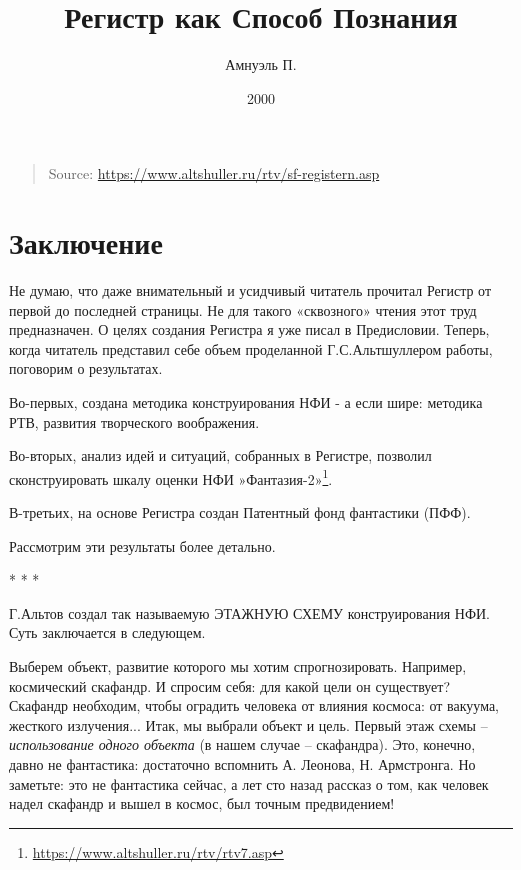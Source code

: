 \documentclass[11pt,a4paper]{article}
\title{Регистр как Способ Познания}
\author{Амнуэль П.}
\date{2000}
\begin{document}
\maketitle

\begin{quote}
  Source: \url{https://www.altshuller.ru/rtv/sf-registern.asp}
\end{quote}
\section*{Заключение}

Не думаю, что даже внимательный и усидчивый читатель прочитал Регистр от
первой до последней страницы. Не для такого «сквозного» чтения этот труд
предназначен. О целях создания Регистра я уже писал в Предисловии. Теперь,
когда читатель представил себе объем проделанной Г.С.Альтшуллером работы,
поговорим о результатах.

Во-первых, создана методика конструирования НФИ - а если шире: методика РТВ,
развития творческого воображения.

Во-вторых, анализ идей и ситуаций, собранных в Регистре, позволил
сконструировать шкалу оценки НФИ
»Фантазия-2»\footnote{\url{https://www.altshuller.ru/rtv/rtv7.asp}}. 

В-третьих, на основе Регистра создан Патентный фонд фантастики (ПФФ).

Рассмотрим эти результаты более детально.
\begin{center}
  * * *
\end{center}
Г.Альтов создал так называемую ЭТАЖНУЮ СХЕМУ конструирования НФИ. Суть
заключается в следующем.

Выберем объект, развитие которого мы хотим спрогнозировать. Например,
космический скафандр. И спросим себя: для какой цели он существует? Скафандр
необходим, чтобы оградить человека от влияния космоса: от вакуума, жесткого
излучения... Итак, мы выбрали объект и цель. Первый этаж схемы --
\emph{использование одного объекта} (в нашем случае -- скафандра). Это,
конечно, давно не фантастика: достаточно вспомнить А. Леонова, Н. Армстронга.
Но заметьте: это не фантастика сейчас, а лет сто назад рассказ о том, как
человек надел скафандр и вышел в космос, был точным предвидением!
\end{document}
